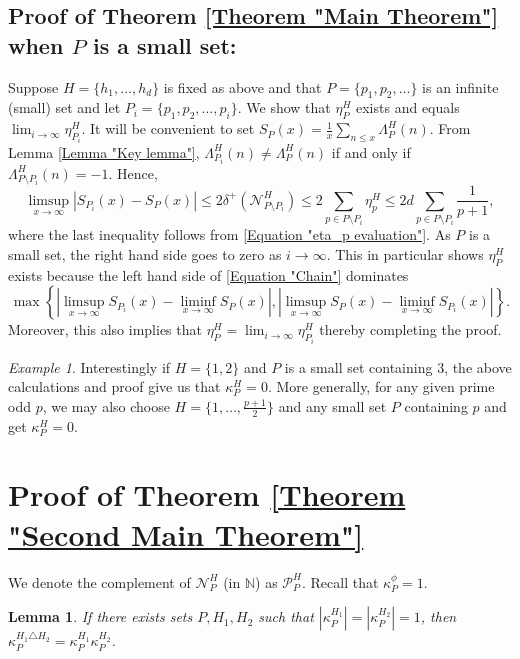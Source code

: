\documentclass[12pt, a4paper]{amsart}
\newtheorem{lemma}{Lemma}
\theoremstyle{remark}
\newtheorem{example}{Example}
\theoremstyle{proof}
\numberwithin{equation}{section}
\numberwithin{assumption}{section}
\newcommand{\N}{\mathbb{N}}
\begin{document}
	 \subsection{Proof of Theorem \ref{Theorem "Main Theorem"} when $P$ is a small set:}	Suppose $H=\{h_1,\ldots,h_d\}$ is fixed as above and that $P = \{p_1,p_2,\ldots\}$ is an infinite (small) set and let $P_i = \{p_1, p_2, \ldots, p_i\}$. We show that $\eta_{P}^H$ exists and equals $\lim_{i\to\infty} \eta_{P_i}^H$. It will be convenient to set $S_P(x) = \frac{1}{x} \sum_{n\leqslant x} \Lambda_{P}^H(n) $. From Lemma \ref{Lemma "Key lemma"}, $ \Lambda_{P_i}^H(n)\neq \Lambda_{P}^H(n) $ if and only if $ \Lambda_{P\setminus P_{i}}^H(n) = -1 $. Hence, 
	\begin{equation}\label{Equation "Chain"}
		\limsup_{x\to\infty}\left|S_{P_i}(x) - S_P(x)\right| \leqslant 2\delta^+\left(\mathcal{N}_{P\setminus P_i}^H\right)\leqslant 2\sum_{p\in P\setminus P_i} \eta_p^H\leqslant 2d \sum_{p\in P\setminus P_i}\frac{1}{p+1},
	\end{equation}
	where the last inequality follows from \eqref{Equation "eta_p evaluation"}. As $P$ is a small set, the right hand side goes to zero as $i\to \infty$. This in particular shows $\eta_P^H$ exists because the left hand side of \eqref{Equation "Chain"} dominates
	\[
	\max\left\{\left|\limsup_{x\to\infty}S_{P_i}(x) - \liminf_{x\to\infty} S_P(x)\right|, \left|\limsup_{x\to\infty}S_{P}(x) - \liminf_{x\to\infty} S_{P_i}(x)\right|\right\}.
	\]
	Moreover, this also implies that $\eta_P^H = \lim_{i\to\infty} \eta_{P_i}^H$ thereby completing the proof.
	
	\begin{example}
		Interestingly if $H=\{1,2\}$ and $P$ is a small set containing $3$, the above calculations and proof give us that $\kappa_P^H=0$. More generally, for any given prime odd $p$, we may also choose $H= \{1,\ldots, \frac{p+1}{2}\}$ and any small set $P$ containing $p$ and get $\kappa_{P}^H=0$.
	\end{example}
			
	\section{Proof of Theorem \ref{Theorem "Second Main Theorem"}}\label{Section "Proof second main"}
	
	We denote the complement of $\mathcal{N}_P^H$ (in $\N$) as $\mathcal{P}_P^H$. Recall that $\kappa_P^{\phi}=1$.
	
	\begin{lemma}\label{Lemma "Second main theorem 1"}
		If there exists sets $P,H_1, H_2$ such that $|\kappa_P^{H_1}|=|\kappa_P^{H_2}|=1$, then $\kappa_P^{H_1\triangle H_2}=\kappa_P^{H_1}\kappa_P^{H_2}$.
	\end{lemma}
	
\end{document}
